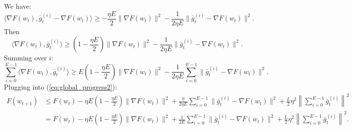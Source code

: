 \documentclass{article}
\begin{document}
We have:
\begin{equation}
    \langle \nabla F(w_t), \bar{g}_t^{(i)} - \nabla F(w_t) \rangle \geq -\frac{\eta E}{2} \| \nabla F(w_t) \|^2 - \frac{1}{2\eta E} \| \bar{g}_t^{(i)} - \nabla F(w_t) \|^2.
\end{equation}
Then
\begin{equation}
    \langle \nabla F(w_t), \bar{g}_t^{(i)} \rangle \geq \left(1 - \frac{\eta E}{2}\right) \| \nabla F(w_t) \|^2 - \frac{1}{2\eta E} \| \bar{g}_t^{(i)} - \nabla F(w_t) \|^2.
\end{equation}
Summing over $i$:
\begin{equation}
    \sum_{i=0}^{E-1} \langle \nabla F(w_t), \bar{g}_t^{(i)} \rangle \geq E\left(1 - \frac{\eta E}{2}\right) \| \nabla F(w_t) \|^2 - \frac{1}{2\eta E} \sum_{i=0}^{E-1} \| \bar{g}_t^{(i)} - \nabla F(w_t) \|^2.
\end{equation}
Plugging into (\ref{eq:global_progress2}):
\begin{align}
    F(w_{t+1}) &\leq F(w_t) - \eta E\left(1 - \frac{\eta E}{2}\right) \| \nabla F(w_t) \|^2 + \frac{\eta}{2\eta E} \sum_{i=0}^{E-1} \| \bar{g}_t^{(i)} - \nabla F(w_t) \|^2 + \frac{L}{2} \eta^2 \left\| \sum_{i=0}^{E-1} \bar{g}_t^{(i)} \right\|^2 \\
    &= F(w_t) - \eta E\left(1 - \frac{\eta E}{2}\right) \| \nabla F(w_t) \|^2 + \frac{1}{2E} \sum_{i=0}^{E-1} \| \bar{g}_t^{(i)} - \nabla F(w_t) \|^2 + \frac{L}{2} \eta^2 \left\| \sum_{i=0}^{E-1} \bar{g}_t^{(i)} \right\|^2.
\end{align}
\end{document}
